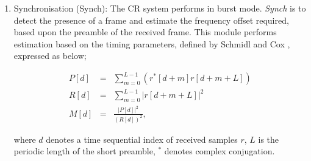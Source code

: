 \begin{enumerate}
\item {Synchronisation (Synch):}
The CR system performs in burst mode.
\emph{Synch} is to detect the presence of a frame and estimate the frequency offset required, based upon the preamble of the received frame.
This module performs estimation based on the timing parameters, defined by Schmidl and Cox \cite{Schmidl1997}, expressed as below;
\begin{center}
\begin{eqnarray}
\label{MMetric}
P[d] &=&\sum_{m =0}^{L-1}    (r^{*}[d+m]r[d+m+L] ) \nonumber \\
R[d] &=&\sum_{m =0}^{L-1}   |r[d+m+L]|^2 \nonumber \\
M[d] &=& \frac{|P[d]|^2} {(R[d])^2},
\end{eqnarray}
\end{center}
where $d$ denotes a time sequential index of received samples $r$, $L$ is the periodic length of the short preamble, $^*$ denotes complex conjugation.


\end{enumerate}
